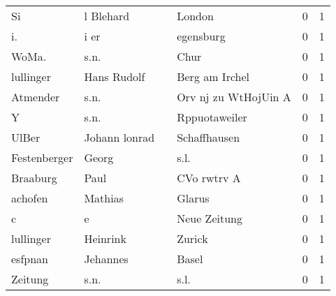 \begin{tabular}{llllrr}
                       Si &                          l Blehard &             &                                      London &          0 &         1 \\
                       i. &                               i er &             &                                   egensburg &          0 &         1 \\
                    WoMa. &                               s.n. &             &                                        Chur &          0 &         1 \\
                lullinger &                        Hans Rudolf &             &                              Berg am Irchel &          0 &         1 \\
                 Atmender &                               s.n. &             &                        Orv nj zu WtHojUin A &          0 &         1 \\
                        Y &                               s.n. &             &                               Rppuotaweiler &          0 &         1 \\
                    UlBer &                      Johann lonrad &             &                                Schaffhausen &          0 &         1 \\
             Festenberger &                              Georg &             &                                        s.l. &          0 &         1 \\
                 Braaburg &                               Paul &             &                                 CVo rwtrv A &          0 &         1 \\
                  achofen &                            Mathias &             &                                      Glarus &          0 &         1 \\
                        c &                                  e &             &                                Neue Zeitung &          0 &         1 \\
                lullinger &                           Heinrink &             &                                      Zurick &          0 &         1 \\
                  esfpnan &                           Jehannes &             &                                       Basel &          0 &         1 \\
                  Zeitung &                               s.n. &             &                                        s.l. &          0 &         1 \\

\end{tabular}
